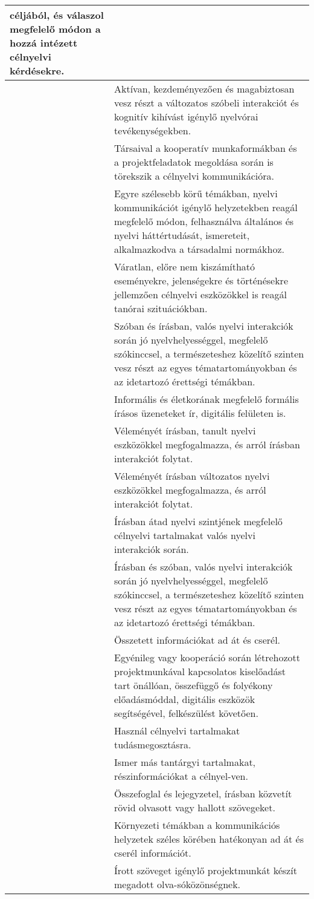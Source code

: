 \begin{longtable}[]{p{\evflength}@{\strut}>{\begin{minipage}{\columnlength}\strut}l<{\strut\end{minipage}}}
  céljából, és válaszol megfelelő módon a hozzá intézett célnyelvi
  kérdésekre.
\tabularnewline
\hline
&
  Aktívan, kezdeményezően és magabiztosan vesz részt a változatos
  szóbeli interakciót és kognitív kihívást igénylő nyelvórai
  tevékenységekben.
\tabularnewline
\hline
&
  Társaival a kooperatív munkaformákban és a projektfeladatok megoldása
  során is törekszik a célnyelvi kommunikációra.
\tabularnewline
\hline
&
  Egyre szélesebb körű témákban, nyelvi kommunikációt igénylő
  helyzetekben reagál megfelelő módon, felhasználva általános és nyelvi
  háttértudását, ismereteit, alkalmazkodva a társadalmi normákhoz.
\tabularnewline
\hline
&
  Váratlan, előre nem kiszámítható eseményekre, jelenségekre és
  történésekre jellemzően célnyelvi eszközökkel is reagál tanórai
  szituációkban.
\tabularnewline
\hline
&
  Szóban és írásban, valós nyelvi interakciók során jó
  nyelvhelyességgel, megfelelő szókinccsel, a természeteshez közelítő
  szinten vesz részt az egyes tématartományokban és az idetartozó
  érettségi témákban.
\tabularnewline
\hline
&
  Informális és életkorának megfelelő formális írásos üzeneteket ír,
  digitális felületen is.
\tabularnewline
\hline
&
  Véleményét írásban, tanult nyelvi eszközökkel megfogalmazza, és arról
  írásban interakciót folytat.
\tabularnewline
\hline
&
  Véleményét írásban változatos nyelvi eszközökkel megfogalmazza, és
  arról interakciót folytat.
\tabularnewline
\hline
&
  Írásban átad nyelvi szintjének megfelelő célnyelvi tartalmakat valós
  nyelvi interakciók során.
\tabularnewline
\hline
&
  Írásban és szóban, valós nyelvi interakciók során jó
  nyelvhelyességgel, megfelelő szókinccsel, a természeteshez közelítő
  szinten vesz részt az egyes tématartományokban és az idetartozó
  érettségi témákban.
\tabularnewline
\hline
&
  Összetett információkat ad át és cserél.
\tabularnewline
\hline
&
  Egyénileg vagy kooperáció során létrehozott projektmunkával
  kapcsolatos kiselőadást tart önállóan, összefüggő és folyékony
  előadásmóddal, digitális eszközök segítségével, felkészülést követően.
\tabularnewline
\hline
&
  Használ célnyelvi tartalmakat tudásmegosztásra.
\tabularnewline
\hline
&
  Ismer más tantárgyi tartalmakat, részinformációkat a célnyel-\break ven.
\tabularnewline
\hline
&
  Összefoglal és lejegyzetel, írásban közvetít rövid olvasott vagy
  hallott szövegeket.
\tabularnewline
\hline
&
  Környezeti témákban a kommunikációs helyzetek széles körében
  hatékonyan ad át és cserél információt.
\tabularnewline
\hline
&
  Írott szöveget igénylő projektmunkát készít megadott olva-\break sóközönségnek.
\tabularnewline

\end{longtable}
